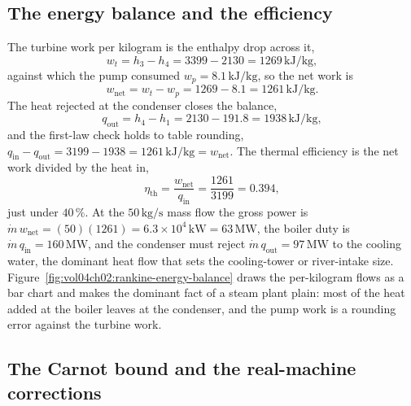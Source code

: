 \subsection{The energy balance and the efficiency}

The turbine work per kilogram is the enthalpy drop across it,
\[
w_t = h_3 - h_4 = 3399 - 2130 = 1269\,\text{kJ}/\text{kg},
\]
against which the pump consumed $w_p = 8.1\,\text{kJ}/\text{kg}$, so the
net work is
\[
w_{\text{net}} = w_t - w_p = 1269 - 8.1 = 1261\,\text{kJ}/\text{kg}.
\]
The heat rejected at the condenser closes the balance,
\[
q_{\text{out}} = h_4 - h_1 = 2130 - 191.8 = 1938\,\text{kJ}/\text{kg},
\]
and the first-law check holds to table rounding, $q_{\text{in}} -
q_{\text{out}} = 3199 - 1938 = 1261\,\text{kJ}/\text{kg} =
w_{\text{net}}$. The thermal efficiency is the net work divided by the
heat in,
\[
\eta_{\text{th}} = \frac{w_{\text{net}}}{q_{\text{in}}} = \frac{1261}{3199}
= 0.394,
\]
just under $40\,\%$. At the $50\,\text{kg}/\text{s}$ mass flow the gross
power is $\dot{m}\,w_{\text{net}} = (50)(1261) = 6.3\times 10^4\,\text{kW}
= 63\,\text{MW}$, the boiler duty is $\dot{m}\,q_{\text{in}} = 160\,
\text{MW}$, and the condenser must reject $\dot{m}\,q_{\text{out}} = 97\,
\text{MW}$ to the cooling water, the dominant heat flow that sets the
cooling-tower or river-intake size. Figure~\ref{fig:vol04ch02:rankine-energy-balance}
draws the per-kilogram flows as a bar chart and makes the dominant fact
of a steam plant plain: most of the heat added at the boiler leaves at
the condenser, and the pump work is a rounding error against the turbine
work.





\subsection{The Carnot bound and the real-machine corrections}


